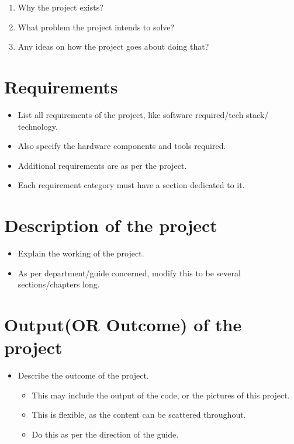 \documentclass[
  12pt,
  a4paper,
  option1,
  option2]{report}
\providecommand{\tightlist}{%
  \setlength{\itemsep}{0pt}\setlength{\parskip}{0pt}}
\begin{document}
\begin{enumerate}
\def\labelenumi{\arabic{enumi}.}
\tightlist
\item
  Why the project exists?
\item
  What problem the project intends to solve?
\item
  Any ideas on how the project goes about doing that?
\end{enumerate}

\chapter{Requirements}\label{sec:Requirements}

\begin{itemize}
\item
  List all requirements of the project, like software required/tech
  stack/ technology.
\item
  Also specify the hardware components and tools required.
\item
  Additional requirements are as per the project.
\item
  Each requirement category must have a section dedicated to it.
\end{itemize}

\chapter{Description of the project}\label{sec:Project}

\begin{itemize}
\tightlist
\item
  Explain the working of the project.
\item
  As per department/guide concerned, modify this to be several
  sections/chapters long.
\end{itemize}

\chapter{Output(OR Outcome) of the project}\label{sec:Conclusion}

\begin{itemize}
\tightlist
\item
  Describe the outcome of the project.

  \begin{itemize}
  \tightlist
  \item
    This may include the output of the code, or the pictures of this
    project.
  \item
    This is flexible, as the content can be scattered throughout.
  \item
    Do this as per the direction of the guide.
  \end{itemize}
\end{itemize}
\end{document}
